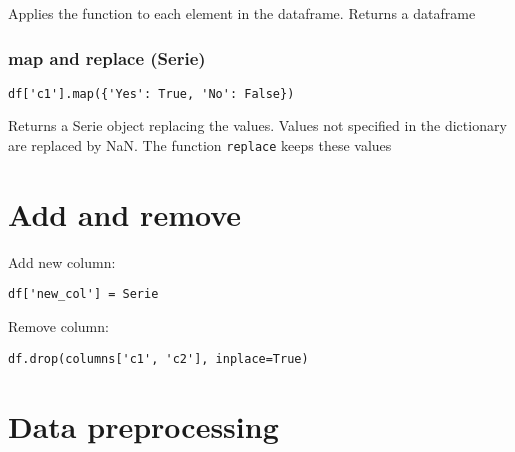 \documentclass[french]{article}
\begin{document}
Applies the function to each element in the dataframe. Returns a dataframe

\subsubsection{map and replace (Serie)}
\begin{verbatim}
df['c1'].map({'Yes': True, 'No': False})
\end{verbatim}
Returns a Serie object replacing the values. Values not specified in the dictionary are replaced by NaN. The function \verb|replace| keeps these values

\section{Add and remove}

Add new column:
\begin{verbatim}
df['new_col'] = Serie
\end{verbatim}

Remove column:
\begin{verbatim}
df.drop(columns['c1', 'c2'], inplace=True)
\end{verbatim}


\section{Data preprocessing}
\end{document}
